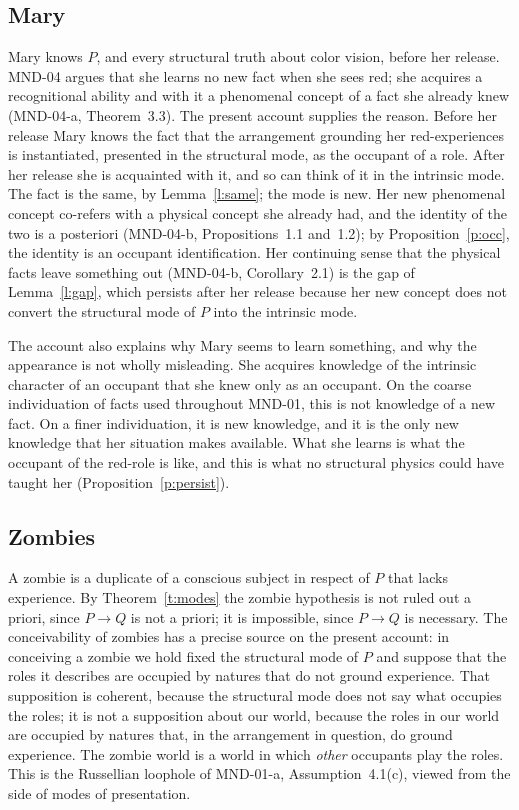 \documentclass{situationist-preprint}
\begin{document}
\subsection{Mary}

Mary knows $P$, and every structural truth about color vision, before her release. MND-04 argues that she learns no new fact when she sees red; she acquires a recognitional ability and with it a phenomenal concept of a fact she already knew (MND-04-a, Theorem~3.3). The present account supplies the reason. Before her release Mary knows the fact that the arrangement grounding her red-experiences is instantiated, presented in the structural mode, as the occupant of a role. After her release she is acquainted with it, and so can think of it in the intrinsic mode. The fact is the same, by Lemma~\ref{l:same}; the mode is new. Her new phenomenal concept co-refers with a physical concept she already had, and the identity of the two is a posteriori (MND-04-b, Propositions~1.1 and~1.2); by Proposition~\ref{p:occ}, the identity is an occupant identification. Her continuing sense that the physical facts leave something out (MND-04-b, Corollary~2.1) is the gap of Lemma~\ref{l:gap}, which persists after her release because her new concept does not convert the structural mode of $P$ into the intrinsic mode.

The account also explains why Mary seems to learn something, and why the appearance is not wholly misleading. She acquires knowledge of the intrinsic character of an occupant that she knew only as an occupant. On the coarse individuation of facts used throughout MND-01, this is not knowledge of a new fact. On a finer individuation, it is new knowledge, and it is the only new knowledge that her situation makes available. What she learns is what the occupant of the red-role is like, and this is what no structural physics could have taught her (Proposition~\ref{p:persist}).

\subsection{Zombies}

A zombie is a duplicate of a conscious subject in respect of $P$ that lacks experience. By Theorem~\ref{t:modes} the zombie hypothesis is not ruled out a priori, since $P \to Q$ is not a priori; it is impossible, since $P \to Q$ is necessary. The conceivability of zombies has a precise source on the present account: in conceiving a zombie we hold fixed the structural mode of $P$ and suppose that the roles it describes are occupied by natures that do not ground experience. That supposition is coherent, because the structural mode does not say what occupies the roles; it is not a supposition about our world, because the roles in our world are occupied by natures that, in the arrangement in question, do ground experience. The zombie world is a world in which \emph{other} occupants play the roles. This is the Russellian loophole of MND-01-a, Assumption~4.1(c), viewed from the side of modes of presentation.
\end{document}
